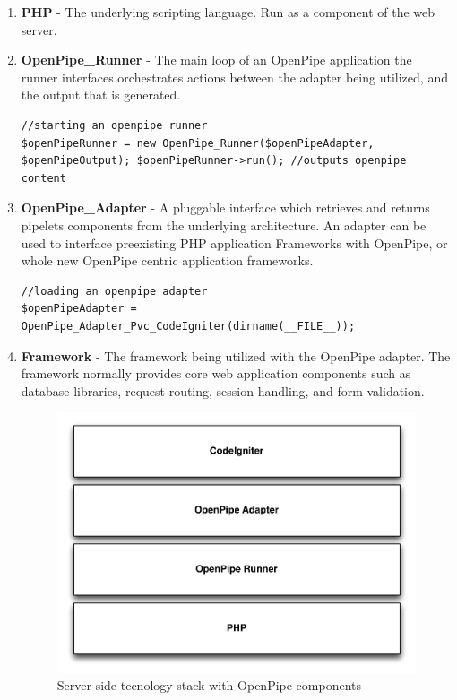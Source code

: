 \documentclass[12pt]{report}
\begin{document}
\begin{enumerate}
	\item \textbf{PHP} - The underlying scripting language. Run as a component of the web server.
	\item \textbf{OpenPipe\_Runner} - The main loop of an OpenPipe application the runner interfaces orchestrates actions between the adapter being utilized, and the output that is generated.
		\begin{lstlisting}
//starting an openpipe runner
$openPipeRunner = new OpenPipe_Runner($openPipeAdapter, $openPipeOutput); $openPipeRunner->run(); //outputs openpipe content
		\end{lstlisting}

	\item \textbf{OpenPipe\_Adapter} - A pluggable interface which retrieves and returns pipelets components from the underlying architecture. An adapter can be used to interface preexisting PHP application Frameworks with OpenPipe, or whole new OpenPipe centric application frameworks.
		\begin{lstlisting}
//loading an openpipe adapter
$openPipeAdapter = OpenPipe_Adapter_Pvc_CodeIgniter(dirname(__FILE__));
		\end{lstlisting}	

	\item \textbf{Framework} - The framework being utilized with the OpenPipe adapter. The framework normally provides core web application components such as database libraries, request routing, session handling, and form validation.
	
		\begin{figure}[H]
		\caption{Server side tecnology stack with OpenPipe components}
		\label{fig:frameworkStack}
		\centering
		\includegraphics[width=\textwidth,keepaspectratio]{figures/images/framework_stack.pdf}
		\end{figure}

\end{enumerate}
\end{document}
